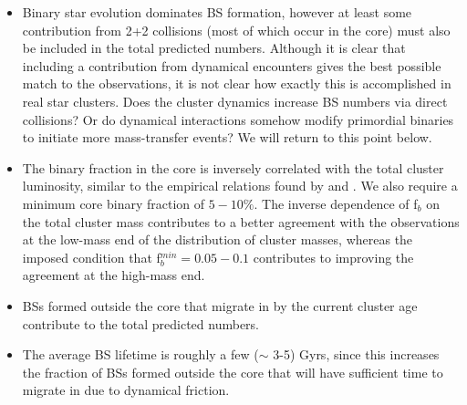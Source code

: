 \begin{itemize}

\item Binary star evolution dominates BS formation, however at least
  some contribution from 2+2 collisions (most of which
  occur in the core) must also be included in the total predicted
  numbers.  Although it is clear that including a contribution from
  dynamical encounters gives the best possible match to the
  observations, it is not clear how exactly this is accomplished in
  real star clusters.  Does the cluster dynamics increase
  BS numbers via direct collisions?  Or do dynamical interactions
  somehow modify primordial binaries to initiate more mass-transfer
  events?  We will return to this point below.

\item The binary fraction in the core is inversely
  correlated with the total cluster luminosity, similar to the
  empirical relations found by \citet{sollima07} and \citet{milone08}.
  We also require a minimum core binary fraction of $5-10\%$.  The
  inverse dependence of f$_b$ on the total cluster mass
  contributes to a better agreement with the observations at the
  low-mass end of the distribution of cluster masses, whereas 
  the imposed condition that f$_b^{min} = 0.05 - 0.1$ contributes to
  improving the agreement at the high-mass end.

\item BSs formed outside the core that migrate in by the
  current cluster age contribute to the total predicted numbers.

\item The average BS lifetime is roughly a few ($\sim$ 3-5) Gyrs, since this
  increases the fraction of BSs formed outside the core that will have
  sufficient time to migrate in due to dynamical friction.

\end{itemize}

